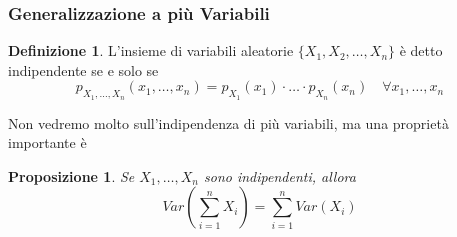 \documentclass{article}
\theoremstyle{plain}
\newtheorem{proposizione}{Proposizione}[section]
\theoremstyle{definition}
\newtheorem{definizione}{Definizione}[section]
\theoremstyle{remark}
\begin{document}
\subsubsection{Generalizzazione a più Variabili} %
\label{ssub:generalizzazione_a_più_variabili}
\begin{definizione}
	L'insieme di variabili aleatorie $\{X_1,X_2,\dots,X_n\}$ è detto indipendente se e solo se
	\begin{equation*}
		p_{X_1,\dots,X_n}(x_1,\dots,x_n)=p_{X_1}(x_1)\cdot\ldots\cdot p_{X_n}(x_n)\quad\forall x_1,\dots,x_n
	\end{equation*}
\end{definizione}
Non vedremo molto sull'indipendenza di più variabili, ma una proprietà importante è
\begin{proposizione}
	Se $X_1,\ldots,X_n$ sono indipendenti, allora
	\begin{equation*}
		Var\left(\sum_{i=1}^nX_i\right)=\sum_{i=1}^nVar(X_i)
	\end{equation*}
\end{proposizione}
\end{document}
